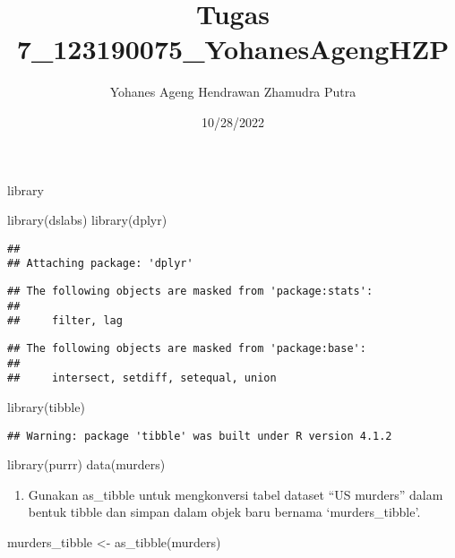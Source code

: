 \documentclass[
]{article}
\title{Tugas 7\_123190075\_YohanesAgengHZP}
\author{Yohanes Ageng Hendrawan Zhamudra Putra}
\date{10/28/2022}
\newenvironment{Shaded}{\begin{snugshade}}{\end{snugshade}}
\newcommand{\FunctionTok}[1]{\textcolor[rgb]{0.00,0.00,0.00}{#1}}
\newcommand{\NormalTok}[1]{#1}
\newcommand{\OtherTok}[1]{\textcolor[rgb]{0.56,0.35,0.01}{#1}}
\providecommand{\tightlist}{%
  \setlength{\itemsep}{0pt}\setlength{\parskip}{0pt}}
\begin{document}
\maketitle

library

\begin{Shaded}
\begin{Highlighting}[]
\FunctionTok{library}\NormalTok{(dslabs)}
\FunctionTok{library}\NormalTok{(dplyr)}
\end{Highlighting}
\end{Shaded}

\begin{verbatim}
## 
## Attaching package: 'dplyr'
\end{verbatim}

\begin{verbatim}
## The following objects are masked from 'package:stats':
## 
##     filter, lag
\end{verbatim}

\begin{verbatim}
## The following objects are masked from 'package:base':
## 
##     intersect, setdiff, setequal, union
\end{verbatim}

\begin{Shaded}
\begin{Highlighting}[]
\FunctionTok{library}\NormalTok{(tibble)}
\end{Highlighting}
\end{Shaded}

\begin{verbatim}
## Warning: package 'tibble' was built under R version 4.1.2
\end{verbatim}

\begin{Shaded}
\begin{Highlighting}[]
\FunctionTok{library}\NormalTok{(purrr)}
\FunctionTok{data}\NormalTok{(murders)}
\end{Highlighting}
\end{Shaded}

\begin{enumerate}
\def\labelenumi{\arabic{enumi}.}
\tightlist
\item
  Gunakan as\_tibble untuk mengkonversi tabel dataset ``US murders''
  dalam bentuk tibble dan simpan dalam objek baru bernama
  `murders\_tibble'.
\end{enumerate}

\begin{Shaded}
\begin{Highlighting}[]
\NormalTok{murders\_tibble }\OtherTok{\textless{}{-}} \FunctionTok{as\_tibble}\NormalTok{(murders)}
\end{Highlighting}
\end{Shaded}
\end{document}
